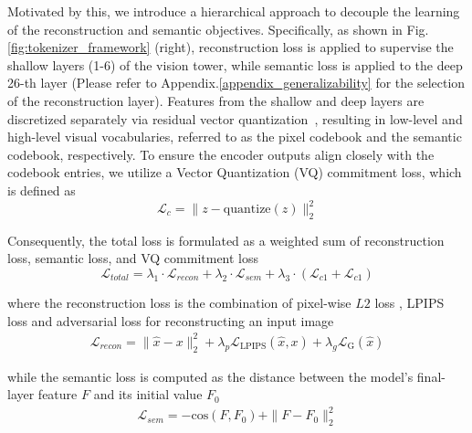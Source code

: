 Motivated by this, we introduce a hierarchical approach to decouple the learning of the reconstruction and semantic objectives. Specifically, as shown in Fig.\ref{fig:tokenizer_framework} (right), reconstruction loss is applied to supervise the shallow layers (1-6) of the vision tower, while semantic loss is applied to the deep 26-th layer (Please refer to Appendix.\ref{appendix_generalizability} for the selection of the reconstruction layer).
Features from the shallow and deep layers are discretized separately via residual vector quantization~\citep{lee2022rqvae}, resulting in low-level and high-level visual vocabularies, referred to as the pixel codebook and the semantic codebook, respectively.
To ensure the encoder outputs align closely with the codebook entries, we utilize a Vector Quantization (VQ) commitment loss, which is defined as
\begin{equation}
  \mathcal{L}_{c} = \| z - \text{quantize}(z) \|_2^2
  \label{eq:loss_commit}
\end{equation}

Consequently, the total loss is formulated as a weighted sum of reconstruction loss, semantic loss, and VQ commitment loss
\begin{equation}
  \mathcal{L}_{total} = \lambda_1 \cdot \mathcal{L}_{recon} + \lambda_2 \cdot \mathcal{L}_{sem} +  \lambda_3 \cdot (\mathcal{L}_{c1} + \mathcal{L}_{c1})
  \label{eq:loss_total}
\end{equation}

where the reconstruction loss is the combination of pixel-wise $L2$ loss \citep{dosovitskiy2016L2}, LPIPS loss \citep{zhang2018lpips} and adversarial loss \citep{isola2017gan} for reconstructing an input image
\begin{equation}
\begin{aligned}
  \mathcal{L}_{recon} = \|\hat{x} - x\|_2^2 + \lambda_p\mathcal{L}_{\text{LPIPS}}(\hat{x},x) + \lambda_g\mathcal{L}_{\text{G}}(\hat{x})
  \label{eq:loss_recon}
\end{aligned}
\end{equation}

while the semantic loss is computed as the distance between the model's final-layer feature $F$ and its initial value $F_0$
\begin{equation}
\begin{aligned}
  \mathcal{L}_{sem} = -\mathrm{cos}(F, F_0) + \|F - F_0\|_2^2
  \label{eq:loss_sem}
\end{aligned}
\end{equation}

